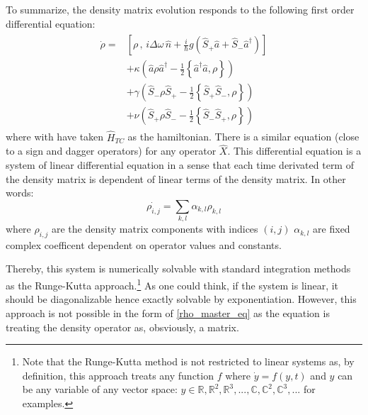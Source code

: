 \documentclass[12pt]{report}
\begin{document}
To summarize, the density matrix evolution responds to the following first order differential equation:
\begin{align}
\label{rho_master_eq}
\begin{split}
\dot{\rho} = &\left[ \rho \, , \, i\Delta\omega\,\hat{n} + \frac{i}{\hbar} g \left(\hat{S}_+ \hat{a} + \hat{S}_-\hat{a}^{\dag} \right)\right]\\
&+ \kappa \left( \hat{a} \rho \hat{a}^\dagger - \frac{1}{2} \left\lbrace \hat{a}^\dagger \hat{a}, \rho \right\rbrace \right)\\
&+ \gamma \left( \hat{S}_- \rho \hat{S}_+ - \frac{1}{2} \left\lbrace \hat{S}_+ \hat{S}_-, \rho \right\rbrace \right)\\
&+ \nu \left( \hat{S}_+ \rho \hat{S}_- - \frac{1}{2} \left\lbrace \hat{S}_- \hat{S}_+, \rho \right\rbrace \right)
\end{split}
\end{align}
where with have taken $\hat{H}_{TC}$ as the hamiltonian. There is a similar equation (close to a sign and dagger operators) for any operator $\hat{X}$. This differential equation is a system of linear differential equation in a sense that each time derivated term of the density matrix is dependent of linear terms of the density matrix. In other words:
\begin{equation}
\dot{\rho_{i,j}} = \sum_{k,l} \alpha_{k,l} \rho_{k,l}
\end{equation}
where $\rho_{i,j}$ are the density matrix components with indices $(i,j)$ $\alpha_{k,l}$ are fixed complex coefficent dependent on operator values and constants. 

Thereby, this system is numerically solvable with standard integration methods as the Runge-Kutta approach.\footnote{Note that the Runge-Kutta method is not restricted to linear systems as, by definition, this approach treats any function $f$ where $\dot{y} = f(y, t)$ and $y$ can be any variable of any vector space: $y \in \mathbb{R}, \mathbb{R}^2, \mathbb{R}^3, ..., \mathbb{C}, \mathbb{C}^2, \mathbb{C}^3, ...$ for examples.} As one could think, if the system is linear, it should be diagonalizable hence exactly solvable by exponentiation. However, this approach is not possible in the form of \eqref{rho_master_eq} as the equation is treating the density operator as, obsviously, a matrix. 
\end{document}
